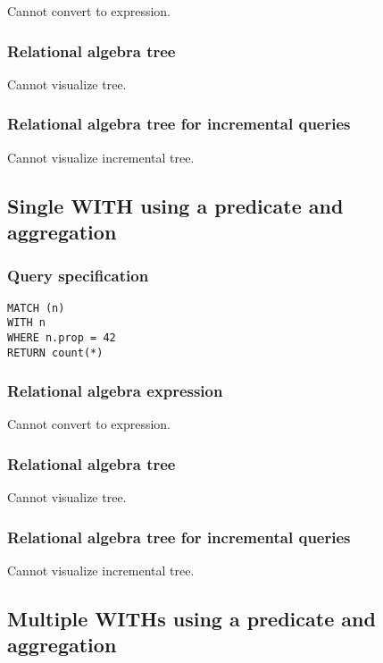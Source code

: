Cannot convert to expression.

\subsubsection*{Relational algebra tree}

Cannot visualize tree.

\subsubsection*{Relational algebra tree for incremental queries}

Cannot visualize incremental tree.

\subsection{Single WITH using a predicate and aggregation}

\subsubsection*{Query specification}

\begin{lstlisting}
MATCH (n)
WITH n
WHERE n.prop = 42
RETURN count(*)
\end{lstlisting}

\subsubsection*{Relational algebra expression}

Cannot convert to expression.

\subsubsection*{Relational algebra tree}

Cannot visualize tree.

\subsubsection*{Relational algebra tree for incremental queries}

Cannot visualize incremental tree.

\subsection{Multiple WITHs using a predicate and aggregation}

